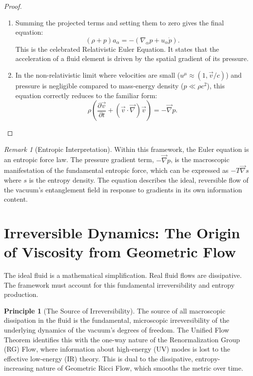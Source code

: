 \documentclass[11pt, letterpaper]{report}
\theoremstyle{plain} %
\theoremstyle{definition} %
\newtheorem{principle}{Principle}[chapter]
\theoremstyle{remark} %
\newtheorem{remark}{Remark}[chapter]
\begin{document}
\begin{proof}
\begin{enumerate}
    \item Summing the projected terms and setting them to zero gives the final equation:
    \begin{equation}
        (\rho+p)a_\alpha = -(\nabla_\alpha p + u_\alpha \dot{p}).
        \label{eq:relativistic_euler}
    \end{equation}
    This is the celebrated Relativistic Euler Equation. It states that the acceleration of a fluid element is driven by the spatial gradient of its pressure.

    \item In the non-relativistic limit where velocities are small ($u^\mu \approx (1, \vec{v}/c)$) and pressure is negligible compared to mass-energy density ($p \ll \rho c^2$), this equation correctly reduces to the familiar form:
    \begin{equation}
        \rho \left( \frac{\partial \vec{v}}{\partial t} + (\vec{v}\cdot\vec{\nabla})\vec{v} \right) = -\vec{\nabla}p.
    \end{equation}
\end{enumerate}
\end{proof}
\begin{remark}[Entropic Interpretation]
Within this framework, the Euler equation is an entropic force law. The pressure gradient term, $-\vec{\nabla}p$, is the macroscopic manifestation of the fundamental entropic force, which can be expressed as $-T\vec{\nabla}s$ where $s$ is the entropy density. The equation describes the ideal, reversible flow of the vacuum's entanglement field in response to gradients in its own information content.
\end{remark}

\section{Irreversible Dynamics: The Origin of Viscosity from Geometric Flow}
\label{sec:hydro_viscosity}

The ideal fluid is a mathematical simplification. Real fluid flows are dissipative. The framework must account for this fundamental irreversibility and entropy production.

\begin{principle}[The Source of Irreversibility]
The source of all macroscopic dissipation in the fluid is the fundamental, microscopic irreversibility of the underlying dynamics of the vacuum's degrees of freedom. The Unified Flow Theorem identifies this with the one-way nature of the Renormalization Group (RG) Flow, where information about high-energy (UV) modes is lost to the effective low-energy (IR) theory. This is dual to the dissipative, entropy-increasing nature of Geometric Ricci Flow, which smooths the metric over time.
\end{principle}
\end{document}
